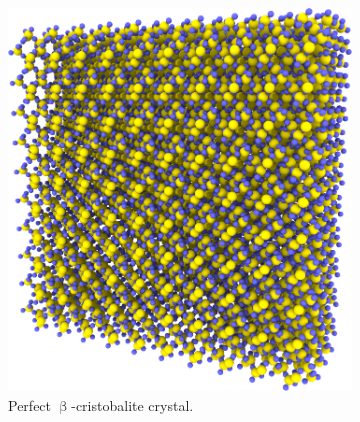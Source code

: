 \begin{figure}[htpb]%
    \setlength{\myfigwidth}{0.35\textwidth}%
    \setlength{\myhfillwidth}{1.5cm}%
    \centering%
    \begin{subfigure}[t]{\myfigwidth}
        \captionsetup{width=1.1\textwidth}%
        \includegraphics[width=\textwidth]{images/experimental_procedure/00_10}%
        \caption{%
            Perfect $\upbeta$-cristobalite crystal.%
            \label{fig:initialization_step00}%
        }%
        \hspace{8pt}
    \end{subfigure}%
    \hspace{\myhfillwidth}%
    \begin{subfigure}[t]{\myfigwidth}%

\end{subfigure}
\end{figure}
